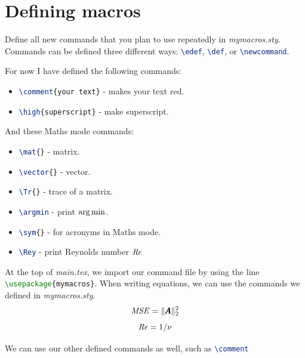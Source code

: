 \section{Defining macros}\label{sec:intro:macros}
Define all new commands that you plan to use repeatedly in \emph{mymacros.sty}. 
Commands can be defined three different ways: \lstinline[language=tex]!\edef!, \lstinline[language=tex]!\def!, or \lstinline[language=tex]!\newcommand!.

For now I have defined the following commands:
\begin{itemize}
    \item \lstinline[language=tex]!\comment{your text}! - makes your text red.
    \item \lstinline[language=tex]!\high{superscript}! - make superscript.
\end{itemize}
And these Maths mode commands:
\begin{itemize}
    \item \lstinline[language=tex]!\mat{}! - matrix.
    \item \lstinline[language=tex]!\vector{}! - vector.
    \item \lstinline[language=tex]!\Tr{}! - trace of a matrix.
    \item \lstinline[language=tex]!\argmin! - print $\operatorname*{arg\,min}$.
    \item \lstinline[language=tex]!\sym{}! - for acronyms in Maths mode.  
    \item \lstinline[language=tex]!\Rey! - print Reynolds number $\mbox{\textit{Re}}$
\end{itemize}

At the top of \emph{main.tex}, we import our command file by using the line \lstinline[language=tex]!\usepackage{mymacros}!.
When writing equations, we can use the commands we defined in \emph{mymacros.sty}.
\begin{equation}
    \mbox{\textit{MSE}} = \| \pmb{A} \|^2_2
\end{equation}
\begin{equation*}
    \mbox{\textit{Re}} = 1/\nu
\end{equation*}

We can use our other defined commands as well, such as \lstinline[language=tex]!\comment! 


